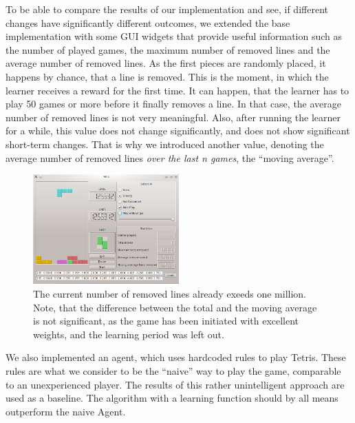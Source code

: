 \documentclass{ml}
\begin{document}
To be able to compare the results of our implementation and see, if different changes have significantly different outcomes, we extended the base implementation with some GUI widgets that provide useful information such as the number of played games, the maximum number of removed lines and the average number of removed lines. As the first pieces are randomly placed, it happens by chance, that a line is removed. This is the moment, in which the learner receives a reward for the first time. It can happen, that the learner has to play 50 games or more before it finally removes a line. In that case, the average number of removed lines is not very meaningful. Also, after running the learner for a while, this value does not change significantly, and does not show significant short-term changes. That is why we introduced another value, denoting the average number of removed lines \textit{over the last n games}, the ``moving average''.

\begin{figure}
  \vspace{-5pt}
  \begin{center}
    \includegraphics[width=0.5\textwidth]{img/three.png}
  \end{center}
  \vspace{-5pt}
  \caption{\small{The current number of removed lines already exeeds one million. Note, that the difference between the total and the moving average is not significant, as the game has been initiated with excellent weights, and the learning period was left out.}}
  \label{three}
  \vspace{-5pt}
\end{figure}

We also implemented an agent, which uses hardcoded rules to play Tetris. 
These rules are what we consider to be the ``naive'' way to play the game, comparable to an unexperienced player. 
The results of this rather unintelligent approach are used as a baseline. 
The algorithm with a learning function should by all means outperform the naive Agent.
\end{document}
